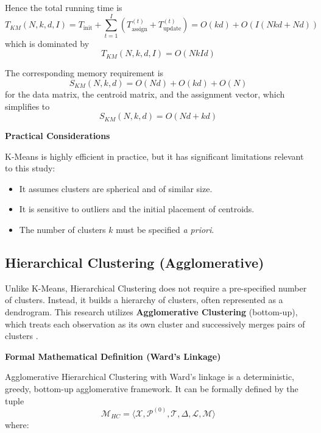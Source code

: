Hence the total running time is
\begin{equation}
  T_{KM}(N,k,d,I) = T_{\text{init}} + \sum_{t=1}^{I}\left(T_{\text{assign}}^{(t)} + T_{\text{update}}^{(t)}\right)
  = O(kd) + O\!\left(I(Nkd + Nd)\right)
\end{equation}
which is dominated by
\begin{equation}
  T_{KM}(N,k,d,I) = O(NkId)
\end{equation}

The corresponding memory requirement is
\begin{equation}
  S_{KM}(N,k,d) = O(Nd) + O(kd) + O(N)
\end{equation}
for the data matrix, the centroid matrix, and the assignment vector, which simplifies to
\begin{equation}
  S_{KM}(N,k,d) = O(Nd + kd)
\end{equation}

\textbf{Practical Considerations}

K-Means is highly efficient in practice, but it has significant limitations relevant to this study:
\begin{itemize}
  \item It assumes clusters are spherical and of similar size.
  \item It is sensitive to outliers and the initial placement of centroids.
  \item The number of clusters $k$ must be specified \textit{a priori}.
\end{itemize}

\subsection{Hierarchical Clustering (Agglomerative)}
Unlike K-Means, Hierarchical Clustering does not require a pre-specified number of clusters. Instead, it builds a hierarchy of clusters, often represented as a dendrogram. This research utilizes \textbf{Agglomerative Clustering} (bottom-up), which treats each observation as its own cluster and successively merges pairs of clusters \cite{ward1963}.

\textbf{Formal Mathematical Definition (Ward's Linkage)}

Agglomerative Hierarchical Clustering with Ward's linkage is a deterministic, greedy, bottom-up agglomerative framework. It can be formally defined by the tuple
\begin{equation}
  \mathcal{M}_{HC} = \langle \mathcal{X}, \mathcal{P}^{(0)}, \mathcal{T}, \Delta, \mathcal{L}, \mathcal{M} \rangle
\end{equation}
where:

